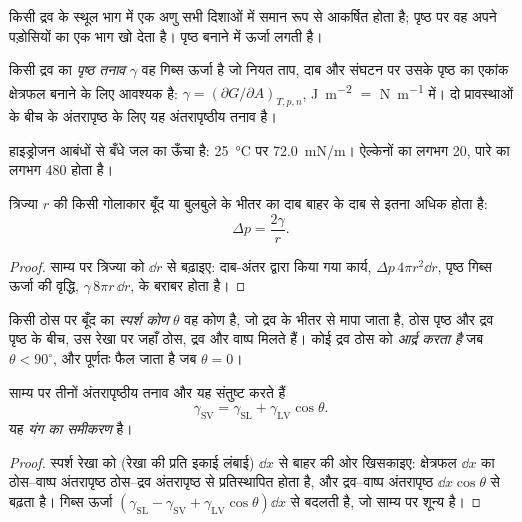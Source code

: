 किसी द्रव के स्थूल भाग में एक अणु सभी दिशाओं में समान रूप से आकर्षित होता है;
पृष्ठ पर वह अपने पड़ोसियों का एक भाग खो देता है। पृष्ठ बनाने में ऊर्जा लगती है।

\begin{definition}[पृष्ठ तनाव]\label{def:b3:colloids:surface-tension}
किसी द्रव का \emph{पृष्ठ तनाव} $\gamma$ वह गिब्स
ऊर्जा है जो नियत ताप, दाब और संघटन पर उसके पृष्ठ का एकांक क्षेत्रफल बनाने के लिए
आवश्यक है: $\gamma = (\partial G/\partial A)_{T,p,n}$, \unit{J.m^{-2}} $=$ \unit{N.m^{-1}} में। दो प्रावस्थाओं के बीच के
अंतरापृष्ठ के लिए यह अंतरापृष्ठीय तनाव है।
\end{definition}

हाइड्रोजन आबंधों से बँधे जल का  ऊँचा है: \qty{25}{\celsius} पर \qty{72.0}{mN/m}।
ऐल्केनों का लगभग 20, पारे का लगभग 480 होता है।

\begin{proposition}[लाप्लास दाब]\label{prop:b3:colloids:laplace}
त्रिज्या $r$ की किसी गोलाकार बूँद या बुलबुले के भीतर का दाब बाहर के
दाब से इतना अधिक होता है:
\[
  \Delta p = \frac{2\gamma}{r} .
\]
\end{proposition}

\begin{proof}
साम्य पर त्रिज्या को $\dd r$ से बढ़ाइए: दाब-अंतर द्वारा किया गया
कार्य, $\Delta p\,4\pi r^2\dd r$, पृष्ठ गिब्स ऊर्जा की वृद्धि, $\gamma\,8\pi r\,\dd r$, के बराबर होता है।
\end{proof}

\begin{definition}[स्पर्श कोण, आर्द्रण]\label{def:b3:colloids:wetting}
किसी ठोस पर बूँद का \emph{स्पर्श कोण} $\theta$ वह कोण है,
जो द्रव के भीतर से मापा जाता है, ठोस पृष्ठ और द्रव पृष्ठ के बीच,
उस रेखा पर जहाँ ठोस, द्रव और वाष्प मिलते हैं। कोई द्रव ठोस को \emph{आर्द्र करता है}
जब $\theta < 90^\circ$, और पूर्णतः फैल जाता है जब $\theta = 0$।
\end{definition}

\begin{theorem}[यंग का समीकरण]\label{thm:b3:colloids:young}
साम्य पर तीनों अंतरापृष्ठीय तनाव और  यह संतुष्ट करते हैं
\[
  \gamma_{\mathrm{SV}} = \gamma_{\mathrm{SL}} + \gamma_{\mathrm{LV}}\cos\theta .
\]
यह \emph{यंग का समीकरण} है।
\end{theorem}

\begin{proof}
स्पर्श रेखा को (रेखा की प्रति इकाई लंबाई) $\dd x$ से बाहर की ओर खिसकाइए: क्षेत्रफल $\dd x$
का ठोस--वाष्प अंतरापृष्ठ ठोस--द्रव अंतरापृष्ठ से प्रतिस्थापित होता है, और
द्रव--वाष्प अंतरापृष्ठ $\dd x\cos\theta$ से बढ़ता है। गिब्स ऊर्जा
$(\gamma_{\mathrm{SL}} - \gamma_{\mathrm{SV}} + \gamma_{\mathrm{LV}}\cos\theta)\dd x$ से बदलती है, जो साम्य पर शून्य है।
\end{proof}

